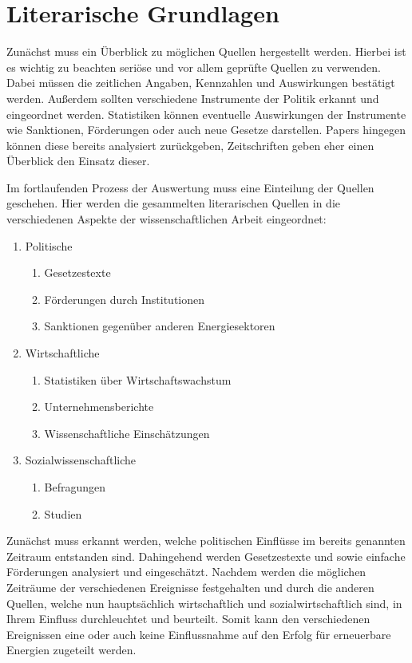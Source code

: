 \documentclass[12pt,a4paper]{article}
\begin{document}
\section*{Literarische Grundlagen}
Zunächst muss ein Überblick zu möglichen Quellen hergestellt werden. 
Hierbei ist es wichtig zu beachten seriöse und vor allem geprüfte Quellen zu verwenden. 
Dabei müssen die zeitlichen Angaben, Kennzahlen und Auswirkungen bestätigt werden. 
Außerdem sollten verschiedene Instrumente der Politik erkannt und eingeordnet werden. 
Statistiken können eventuelle Auswirkungen der Instrumente wie Sanktionen, Förderungen oder 
auch neue Gesetze darstellen. Papers hingegen können diese bereits analysiert zurückgeben, 
Zeitschriften geben eher einen Überblick den Einsatz dieser.

Im fortlaufenden Prozess der Auswertung muss eine Einteilung der Quellen geschehen. 
Hier werden die gesammelten literarischen Quellen in die verschiedenen Aspekte der 
wissenschaftlichen Arbeit eingeordnet: 

\begin{enumerate}
	\item Politische
	\begin{enumerate}
		\item Gesetzestexte
		\item Förderungen durch Institutionen
		\item Sanktionen gegenüber anderen Energiesektoren 
	\end{enumerate}
	\item Wirtschaftliche
	\begin{enumerate}
		\item Statistiken über Wirtschaftswachstum 
		\item Unternehmensberichte
		\item Wissenschaftliche Einschätzungen 
	\end{enumerate}
	\item Sozialwissenschaftliche
	\begin{enumerate}
		\item Befragungen
		\item Studien
	\end{enumerate}
\end{enumerate}

Zunächst muss erkannt werden, welche politischen Einflüsse im bereits genannten Zeitraum 
entstanden sind. Dahingehend werden Gesetzestexte und sowie einfache Förderungen analysiert 
und eingeschätzt. Nachdem werden die möglichen Zeiträume der verschiedenen Ereignisse 
festgehalten und durch die anderen Quellen, welche nun hauptsächlich wirtschaftlich und 
sozialwirtschaftlich sind, in Ihrem Einfluss durchleuchtet und beurteilt. 
Somit kann den verschiedenen Ereignissen eine oder auch keine Einflussnahme auf den Erfolg 
für erneuerbare Energien zugeteilt werden. 
\end{document}
